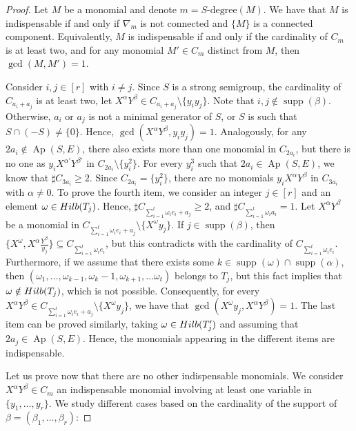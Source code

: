 \documentclass[10pt,a4paper]{amsart}
\def\Ap{\operatorname{Ap}}
\def\supp{\operatorname{supp}}
\begin{document}
\begin{proof}
Let $M$ be a monomial and denote $m = S\text{-degree}(M)$. We have that $M$ is indispensable if and only if $\nabla_m$ is not connected and $\{M\}$ is a connected component. Equivalently, $M$ is indispensable if and only if the cardinality of $C_{m}$ is at least two, and for any monomial $M' \in C_m$ distinct from $M$, then $\gcd(M, M') = 1$.

Consider $i,j\in [r]$ with $i\neq j$. Since $S$ is a strong semigroup, the cardinality of $C_{a_i+a_j}$ is at least two, let $X^\alpha Y^\beta \in C_{a_i+a_j}\setminus\{y_iy_j\}$. Note that $i,j\notin \supp (\beta)$. Otherwise, $a_i$ or $a_j$ is not a minimal generator of $S$, or $S$ is such that $S\cap (-S)\neq \{0\}$. Hence, $\gcd(X^\alpha Y^\beta,y_iy_j) = 1$.
Analogously, for any $2a_i\notin\Ap(S,E)$, there also exists more than one monomial in $C_{2a_i}$, but there is no one as $y_iX^{\alpha'} Y^{\beta'}$ in $C_{2a_i}\setminus\{y_i^2\}$.
For every $y_i^3$ such that $2a_i \in \Ap (S,E)$, we know that $\sharp C_{3a_i} \ge 2$. Since $C_{2a_i}=\{y_i^2\}$, there are no monomials $y_iX^\alpha Y^\beta$ in $C_{3a_i}$ with $\alpha\neq 0$.
To prove the fourth item, we consider an integer $j\in [r]$ and an element $\omega \in {\rm Hilb} (T_j)$. Hence, $\sharp C_{\sum_{i=1}^t \omega_i e_i+a_j}\ge 2$, and $\sharp C_{\sum_{i=1}^t \omega_i a_i}=1$. Let $X^\alpha Y^\beta$ be a monomial in $C_{\sum_{i=1}^t \omega_i e_i+a_j}\setminus \{X^\omega y_j\}$. If $j \in \supp(\beta)$, then $\{X^\omega,X^\alpha \frac{Y^\beta}{y_j}\}\subseteq C_{\sum_{i=1}^t \omega_i e_i}$, but this contradicts with the cardinality of $C_{\sum_{i=1}^t \omega_i e_i}$. Furthermore, if we assume that there exists some $k\in \supp(\omega)\cap \supp(\alpha)$, then $(\omega_1,\ldots, \omega_{k-1},\omega_{k}-1,\omega_{k+1},\ldots \omega_t)$ belongs to $T_j$, but this fact implies that $\omega \notin {\rm Hilb} (T_j)$, which is not possible. Consequently, for every $X^\alpha Y^\beta \in C_{\sum_{i=1}^t \omega_i e_i+a_j}\setminus \{X^\omega y_j\}$, we have that $\gcd(X^\omega y_j,X^\alpha Y^\beta) = 1$. The last item can be proved similarly, taking $\omega \in {\rm Hilb} (T'_j)$ and assuming that $2a_j\in\Ap(S,E)$. Hence, the monomials appearing in the different items are indispensable.

Let us prove now that there are no other indispensable monomials. We consider $X^\alpha Y^\beta \in C_m$ an indispensable monomial  involving at least one variable in $\{y_1,\ldots,y_r\}$. We study different cases based on the cardinality of the support of $\beta=(\beta_1,\ldots,\beta_r)$:


\end{proof}
\end{document}
